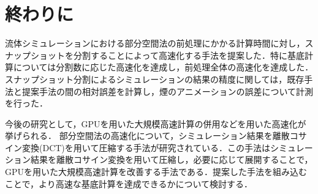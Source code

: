 \documentclass[a4j,12pt]{jreport}
\begin{document}
\chapter{終わりに}
流体シミュレーションにおける部分空間法の前処理にかかる計算時間に対し，スナップショットを分割することによって高速化する手法を提案した．特に基底計算については分割数に応じた高速化を達成し，前処理全体の高速化を達成した．スナップショット分割によるシミュレーションの結果の精度に関しては，既存手法と提案手法の間の相対誤差を計算し，煙のアニメーションの誤差について計測を行った．

今後の研究として，GPUを用いた大規模高速計算の併用などを用いた高速化が挙げられる．
部分空間法の高速化について，シミュレーション結果を離散コサイン変換(DCT)を用いて圧縮する手法\cite{subspaceDCT}が研究されている．この手法はシミュレーション結果を離散コサイン変換を用いて圧縮し，必要に応じて展開することで，GPUを用いた大規模高速計算を改善する手法である．提案した手法を組み込むことで，より高速な基底計算を達成できるかについて検討する．
\end{document}
